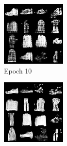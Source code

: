 \documentclass{article}
\begin{document}
\begin{figure}[h!]
    \centering
    \begin{subfigure}{0.19\textwidth}
        \includegraphics[width=\linewidth]{images/image_at_epoch_010.png}
        \caption{Epoch 10}
    \end{subfigure}
    \begin{subfigure}{0.19\textwidth}
        \includegraphics[width=\linewidth]{images/image_at_epoch_020.png}

\end{subfigure}
\end{figure}
\end{document}
